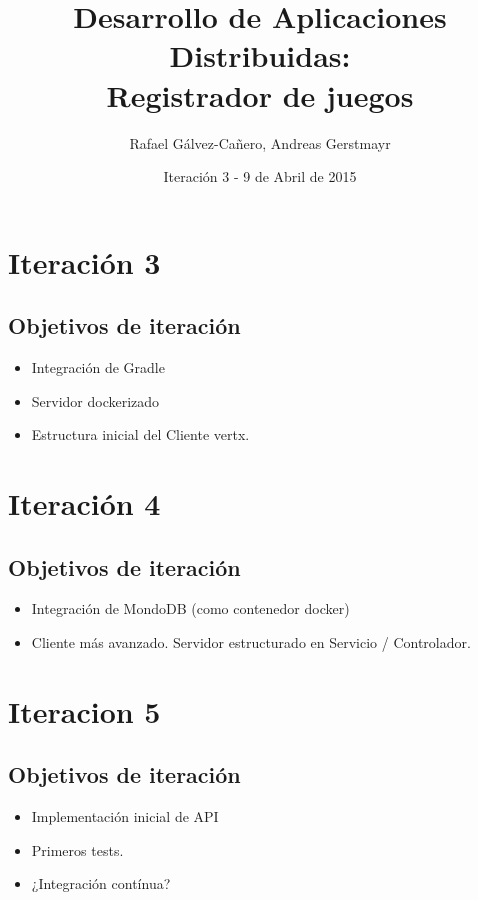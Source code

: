 \documentclass[12pt,a4paper]{report}
\title{Desarrollo de Aplicaciones Distribuidas: \\ Registrador de juegos}
\author{Rafael Gálvez-Cañero, Andreas Gerstmayr}
\date{Iteración 3 - 9 de Abril de 2015} %
\begin{document}
\maketitle
\tableofcontents
\listoffigures
\listoftables






\chapter{Iteración 3}
\section{Objetivos de iteración}
\begin{itemize}
  \item Integración de Gradle 
  \item Servidor dockerizado
  \item Estructura inicial del Cliente vertx.
\end{itemize}

\chapter{Iteración 4}
\section{Objetivos de iteración}
\begin{itemize}
  \item Integración de MondoDB (como contenedor docker) 
  \item Cliente más avanzado. Servidor estructurado en Servicio / Controlador.
\end{itemize}

\chapter{Iteracion 5}
\section{Objetivos de iteración}
\begin{itemize}
  \item Implementación inicial de API
  \item Primeros tests. 
  \item ¿Integración contínua?
\end{itemize}
\end{document}
